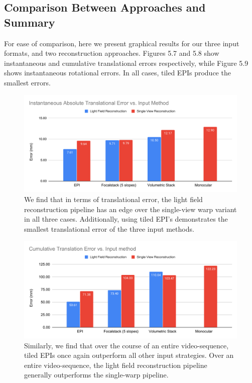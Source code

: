 \subsection{Comparison Between Approaches and Summary}

For ease of comparison, here we present graphical results for our three input formats, and two reconstruction approaches. Figures 5.7 and 5.8 show instantaneous and cumulative translational errors respectively, while Figure 5.9 shows instantaneous rotational errors. In all cases, tiled EPIs produce the smallest errors. 

\begin{figure}[H]
    \includegraphics[width=\textwidth]{images/result-examples/bargraphs/iate-vs-inputmethod2.pdf}
    \caption[Instantaneous translational errors vs. input methods.]{We find that in terms of translational error, the light field reconstruction pipeline has an edge over the single-view warp variant in all three cases. Additionally, using tiled EPI's demonstrates the smallest translational error of the three input methods.}
\end{figure}
\begin{figure}[H]
    \includegraphics[width=\textwidth]{images/result-examples/bargraphs/cte-vs-input-method2.pdf}
    \caption[Cumulative translational errors vs. input methods.]{Similarly, we find that over the course of an entire video-sequence, tiled EPIs once again outperform all other input strategies. Over an entire video-sequence, the light field reconstruction pipeline generally outperforms the single-warp pipeline.}
\end{figure}
